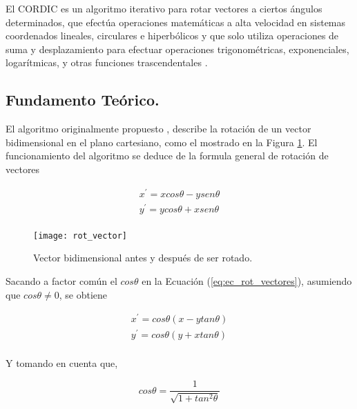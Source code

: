 El CORDIC es un algoritmo iterativo para rotar vectores a ciertos ángulos determinados, que efectúa operaciones matemáticas a alta velocidad en sistemas coordenados lineales, circulares e hiperbólicos y que solo utiliza operaciones de suma y desplazamiento para efectuar operaciones trigonométricas, exponenciales, logarítmicas, y otras funciones trascendentales \cite{DoubleCordic}.


\subsection{Fundamento Teórico.}

El algoritmo originalmente propuesto \cite{CORDIC}, describe la rotación de un vector bidimensional en el plano cartesiano, como el mostrado en la Figura \ref{fig:rot_vector}. El funcionamiento del algoritmo se deduce de la formula general de rotación de vectores \cite{scalable_CORDIC}

\begin{equation}\label{eq:ec_rot_vectores}
\begin{array}{l}
     x^{\prime} = xcos \theta - ysen \theta \\
     y^{\prime} = ycos \theta + xsen \theta \\
\end{array}
\end{equation}

\begin{figure}[htb]
  \centering
  \texttt{[image: rot\_vector]}
  \caption{Vector bidimensional antes y después de ser rotado.}
  \label{fig:rot_vector}
\end{figure}

Sacando a factor común el $cos\theta$ en la Ecuación (\ref{eq:ec_rot_vectores}), asumiendo que $cos\theta \neq 0$, se obtiene \cite{scalable_CORDIC}

\begin{equation}\label{eq:ec_rot_vectores2}
\begin{array}{l}
     x^{\prime} = cos \theta(x - ytan \theta )\\
     y^{\prime} = cos \theta(y + xtan \theta )\\
\end{array}
\end{equation}

Y tomando en cuenta que,

\begin{equation}\label{eq:cos_cita}
 cos\theta = \dfrac{1}{\sqrt{1 + tan^{2}\theta}}
\end{equation}

